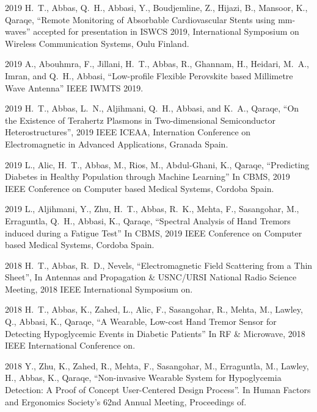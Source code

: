 \documentclass[10pt]{article}
\begin{document}
\begin{bibenum}

\item[2019] H.~T., Abbas, Q.~H., Abbasi, Y., Boudjemline, Z., Hijazi, B., Mansoor, K., Qaraqe, ``Remote Monitoring of Absorbable Cardiovascular Stents using mm-waves'' accepted for presentation in ISWCS 2019, International Symposium on Wireless Communication Systems, Oulu Finland.

\item[2019] A., Abouhmra, F., Jillani, H.~T., Abbas, R., Ghannam, H., Heidari, M.~A., Imran, and Q.~H., Abbasi, ``Low-profile Flexible Perovskite based Millimetre Wave Antenna'' IEEE IWMTS 2019.

\item[2019] H.~T., Abbas, L.~N., Aljihmani, Q.~H., Abbasi, and K.~A., Qaraqe, ``On the Existence of Terahertz Plasmons in Two-dimensional Semiconductor Heterostructures'', 2019 IEEE ICEAA, Internation Conference on Electromagnetic in Advanced Applications, Granada Spain.

\item[2019] L., Alic, H.~T., Abbas, M., Rios, M., Abdul-Ghani, K., Qaraqe, ``Predicting Diabetes in Healthy Population through Machine Learning'' In  CBMS, 2019 IEEE Conference on Computer based Medical Systems, Cordoba Spain.

\item[2019] L., Aljihmani, Y., Zhu, H.~T., Abbas, R.~K., Mehta, F., Sasangohar, M., Erraguntla, Q.~H., Abbasi, K., Qaraqe, ``Spectral Analysis of Hand Tremors induced during a Fatigue Test'' In  CBMS, 2019 IEEE Conference on Computer based Medical Systems, Cordoba Spain.

\item[2018] H.~T., Abbas, R.~D., Nevels, ``Electromagnetic Field Scattering from a Thin Sheet'', In Antennas and Propagation \& USNC/URSI National Radio Science Meeting, 2018 IEEE International Symposium on.

\item[2018] H.~T., Abbas, K., Zahed, L., Alic, F., Sasangohar, R., Mehta, M., Lawley, Q., Abbasi, K., Qaraqe, ``A Wearable, Low-cost Hand Tremor Sensor for Detecting Hypoglycemic Events in Diabetic Patients'' In  RF \& Microwave, 2018 IEEE International Conference on.

\item[2018] Y., Zhu, K., Zahed, R., Mehta, F., Sasangohar, M., Erraguntla, M., Lawley, H., Abbas, K., Qaraqe, ``Non-invasive Wearable System for Hypoglycemia Detection: A Proof of Concept User-Centered Design Process''. In Human Factors and Ergonomics Society's 62nd Annual Meeting, Proceedings of.


\end{bibenum}
\end{document}
